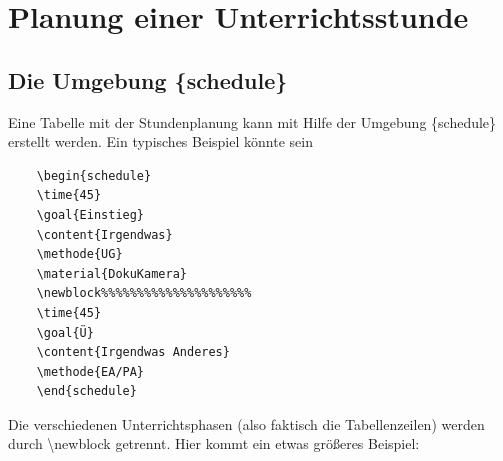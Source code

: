 \documentclass[hyperworksheet,pgfplots]{drcschool}
\newcommand*{\cs}[1]{\textup{\ttfamily\textbackslash#1}}                   %
\newcommand*{\env}[1]{\textup{\ttfamily\{#1\}}}                            %
\begin{document}


\section{Planung einer Unterrichtsstunde}
\subsection{Die Umgebung \{schedule\}}
Eine Tabelle mit der Stundenplanung kann mit Hilfe der Umgebung \env{schedule} erstellt werden.
Ein typisches Beispiel könnte sein
\begin{verbatim}
    \begin{schedule}
    \time{45}
    \goal{Einstieg}
    \content{Irgendwas}
    \methode{UG}
    \material{DokuKamera}
    \newblock%%%%%%%%%%%%%%%%%%%%%
    \time{45}
    \goal{Ü}
    \content{Irgendwas Anderes}
    \methode{EA/PA}
    \end{schedule}
\end{verbatim}
Die verschiedenen Unterrichtsphasen (also faktisch die Tabellenzeilen) werden durch \cs{newblock}
getrennt. Hier kommt ein etwas größeres Beispiel:

\end{document}
